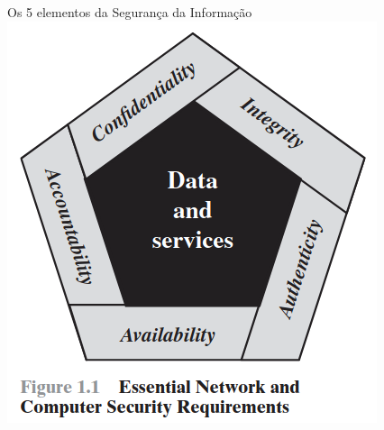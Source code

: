 \begin{frame}{Os 5 elementos da Segurança da Informação}
    \centering
    \includegraphics[width=0.5\linewidth]{Figuras/Figure1.1.png}






\end{frame}






